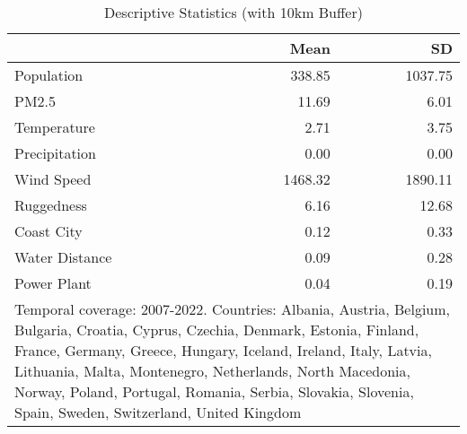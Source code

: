 \begin{table}

\caption{Descriptive Statistics (with 10km Buffer)}
\centering
\begin{tabular}[t]{lrr}
\toprule
  & Mean & SD\\
\midrule
Population & \num{338.85} & \num{1037.75}\\
PM2.5 & \num{11.69} & \num{6.01}\\
Temperature & \num{2.71} & \num{3.75}\\
Precipitation & \num{0.00} & \num{0.00}\\
Wind Speed & \num{1468.32} & \num{1890.11}\\
Ruggedness & \num{6.16} & \num{12.68}\\
Coast City & \num{0.12} & \num{0.33}\\
Water Distance & \num{0.09} & \num{0.28}\\
Power Plant & \num{0.04} & \num{0.19}\\
\bottomrule
\multicolumn{3}{l}{\rule{0pt}{1em}Temporal coverage: 2007-2022. Countries: Albania, Austria, Belgium, Bulgaria, Croatia, Cyprus, Czechia, Denmark, Estonia, Finland, France, Germany, Greece, Hungary, Iceland, Ireland, Italy, Latvia, Lithuania, Malta, Montenegro, Netherlands, North Macedonia, Norway, Poland, Portugal, Romania, Serbia, Slovakia, Slovenia, Spain, Sweden, Switzerland, United Kingdom}\\
\end{tabular}
\end{table}
